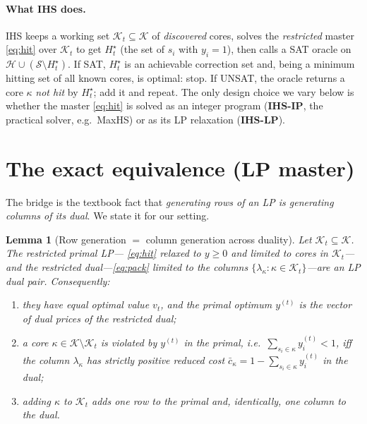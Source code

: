 \documentclass[11pt,a4paper]{article}
\newtheorem{lemma}{Lemma}
\begin{document}
\paragraph{What IHS does.} IHS keeps a working set $\mathcal{K}_t \subseteq
\mathcal{K}$ of \emph{discovered} cores, solves the \emph{restricted} master
\eqref{eq:hit} over $\mathcal{K}_t$ to get $H_t^\star$ (the set of $s_i$ with
$y_i = 1$), then calls a SAT oracle on $\mathcal{H} \cup (\mathcal{S} \setminus
H_t^\star)$. If SAT, $H_t^\star$ is an achievable correction set and, being a
minimum hitting set of all known cores, is optimal: stop. If UNSAT, the oracle
returns a core $\kappa$ \emph{not hit} by $H_t^\star$; add it and repeat. The
only design choice we vary below is whether the master \eqref{eq:hit} is solved
as an integer program (\textbf{IHS-IP}, the practical solver, e.g.\ MaxHS) or as
its LP relaxation (\textbf{IHS-LP}).

\section{The exact equivalence (LP master)}
\label{sec:equiv}

The bridge is the textbook fact that \emph{generating rows of an LP is
generating columns of its dual}. We state it for our setting.

\begin{lemma}[Row generation $=$ column generation across duality]
\label{lem:rowcol}
Let $\mathcal{K}_t \subseteq \mathcal{K}$. The restricted primal LP---
\eqref{eq:hit} relaxed to $y\ge0$ and limited to cores in $\mathcal{K}_t$---and
the restricted dual---\eqref{eq:pack} limited to the columns $\{\lambda_\kappa :
\kappa \in \mathcal{K}_t\}$---are an LP dual pair. Consequently:
\begin{enumerate}
\item[(i)] they have equal optimal value $v_t$, and the primal optimum $y^{(t)}$
is the vector of dual prices of the restricted dual;
\item[(ii)] a core $\kappa \in \mathcal{K}\setminus\mathcal{K}_t$ is
\emph{violated} by $y^{(t)}$ in the primal, i.e.\ $\sum_{s_i \in \kappa}
y^{(t)}_i < 1$, \emph{iff} the column $\lambda_\kappa$ has \emph{strictly
positive reduced cost} $\bar c_\kappa = 1 - \sum_{s_i\in\kappa} y^{(t)}_i$ in
the dual;
\item[(iii)] adding $\kappa$ to $\mathcal{K}_t$ adds one row to the primal and,
identically, one column to the dual.
\end{enumerate}
\end{lemma}
\end{document}
